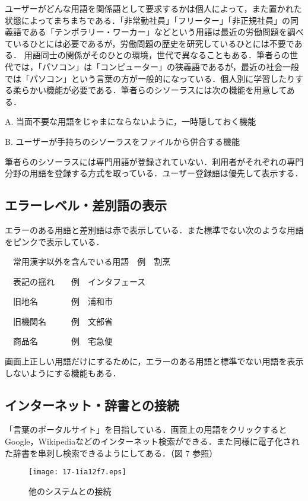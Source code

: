 \documentclass[japanese]{jnlp_1.4}
\begin{document}
ユーザーがどんな用語を関係語として要求するかは個人によって，また置かれた状態によってまちまちである．「非常勤社員」「フリーター」「非正規社員」の同義語である「テンポラリー・ワーカー」などという用語は最近の労働問題を調べているひとには必要であるが，労働問題の歴史を研究しているひとには不要である．
用語同士の関係がそのひとの環境，世代で異なることもある．筆者らの世代では，「パソコン」は「コンピューター」の狭義語であるが，最近の社会一般では「パソコン」という言葉の方が一般的になっている．個人別に学習したりする柔らかい機能が必要である．筆者らのシソーラスには次の機能を用意してある．

A. 当面不要な用語をじゃまにならないように，一時隠しておく機能

B. ユーザーが手持ちのシソーラスをファイルから併合する機能

筆者らのシソーラスには専門用語が登録されていない．利用者がそれぞれの専門分野の用語を登録する方式を取っている．ユーザー登録語は優先して表示する．


\subsection{エラーレベル・差別語の表示}

 エラーのある用語と差別語は赤で表示している．また標準でない次のような用語をピンクで表示している．

　常用漢字以外を含んでいる用語　例　割烹

　表記の揺れ　　例　インタフェース

　旧地名　　　　例　浦和市

　旧機関名　　　例　文部省

　商品名　　　　例　宅急便

画面上正しい用語だけにするために，エラーのある用語と標準でない用語を表示しないようにする機能もある．

\subsection{インターネット・辞書との接続}

「言葉のポータルサイト」を目指している．画面上の用語をクリックするとGoogle，Wikipediaなどのインターネット検索ができる．また同様に電子化された辞書を串刺し検索できるようにしてある．（図 7 参照）

\begin{figure}[t]
 \begin{center}
  \texttt{[image: 17-1ia12f7.eps]}
 \end{center}
 \caption{他のシステムとの接続}
 \label{fig:7}
\end{figure}
\end{document}

